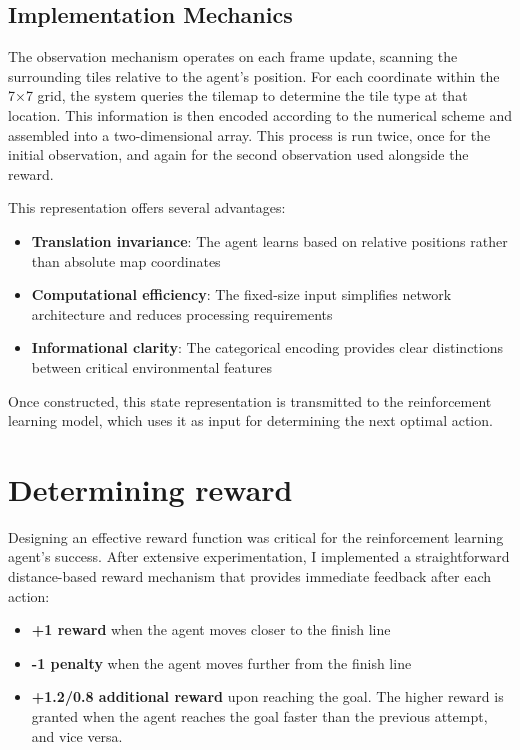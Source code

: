 \subsection{Implementation Mechanics}

The observation mechanism operates on each frame update, scanning the surrounding tiles relative to the agent's position. 
For each coordinate within the 7×7 grid, the system queries the tilemap to determine the tile type at that location. 
This information is then encoded according to the numerical scheme and assembled into a two-dimensional array.
This process is run twice, once for the initial observation, and again for the second observation used alongside the reward.

This representation offers several advantages:
\begin{itemize}
    \item \textbf{Translation invariance}: The agent learns based on relative positions rather than absolute map coordinates
    \item \textbf{Computational efficiency}: The fixed-size input simplifies network architecture and reduces processing requirements
    \item \textbf{Informational clarity}: The categorical encoding provides clear distinctions between critical environmental features
\end{itemize}

Once constructed, this state representation is transmitted to the reinforcement learning model, which uses it as input for determining the next optimal action. 

\section{Determining reward}
Designing an effective reward function was critical for the reinforcement learning agent's success. After extensive experimentation, I implemented a straightforward distance-based reward mechanism that provides immediate feedback after each action:

\begin{itemize}
    \item \textbf{+1 reward} when the agent moves closer to the finish line
    \item \textbf{-1 penalty} when the agent moves further from the finish line
    \item \textbf{+1.2/0.8 additional reward} upon reaching the goal. The higher reward is granted when the agent reaches the goal faster than the previous attempt, and vice versa.
\end{itemize}

